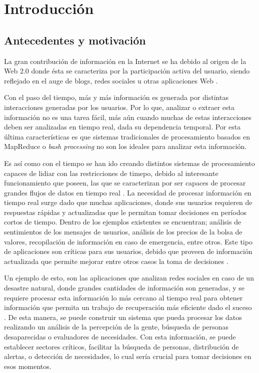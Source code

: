 \chapter{Introducción}
\label{cap:introduccion}

\section{Antecedentes y motivación}
\label{intro:motivacion}

La gran contribución de información en la Internet se ha debido al origen de la Web 2.0 donde ésta se caracteriza por la participación activa del usuario, siendo reflejado en el auge de blogs, redes sociales u otras aplicaciones Web \citep{web2007oberhelman}.


Con el paso del tiempo, más y más información es generada por distintas interacciones generadas por los usuarios. Por lo que, analizar o extraer esta información no es una tarea fácil, más aún cuando muchas de estas interacciones deben ser analizadas en tiempo real, dada su dependencia temporal. Por esta última características es que sistemas tradicionales de procesamiento basados en MapReduce \citep{2010Lin} o \textit{bash processing} \citep{HawwashN14} no son los ideales para analizar esta información.

Es así como con el tiempo se han ido creando distintos sistemas de procesamiento capaces de lidiar con las restricciones de timepo, debido al interesante funcionamiento que poseen, las que se caracterizan por ser capaces de procesar grandes flujos de datos en tiempo real \citep{ChenZ14a}. La necesidad de procesar informaci\'on en tiempo real surge dado que muchas aplicaciones, donde sus usuarios requieren de respuestas r\'apidas y actualizadas que le permitan tomar decisiones en per\'iodos cortos de tiempo. Dentro de los ejemplos existentes se encuentran; análisis de sentimientos de los mensajes de usuarios, análisis de los precios de la bolsa de valores, recopilación de información en caso de emergencia, entre otros. Este tipo de aplicaciones son críticas para sus usuarios, debido que proveen de información actualizada que permite mejorar entre otros casos la toma de decisiones \citep{Wenzel14}.

Un ejemplo de esto, son las aplicaciones que analizan redes sociales en caso de un desastre natural, donde grandes cantidades de información son generadas, y se requiere procesar esta información lo más cercano al tiempo real para obtener información que permita un trabajo de recuperación más eficiente dado el suceso \citep{andrade2014fundamentals}. De esta manera, se puede construir un sistema que pueda procesar los datos realizando un análisis de la percepción de la gente, búsqueda de personas desaparecidas o evaluadores de necesidades. Con esta información, se puede establecer sectores críticos, facilitar la búsqueda de personas, distribución de alertas, o detección de necesidades, lo cual sería crucial para tomar decisiones en esos momentos.

